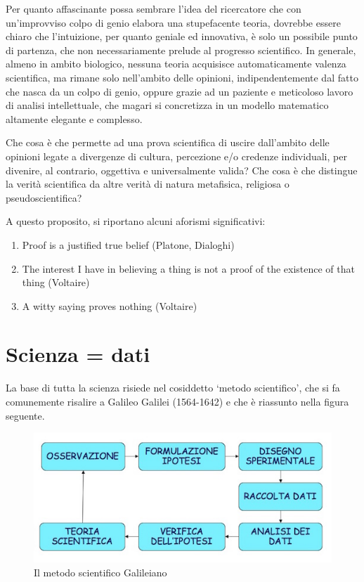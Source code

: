 \documentclass[a4paper,12pt,oneside]{book}
\providecommand{\tightlist}{%
  \setlength{\itemsep}{0pt}\setlength{\parskip}{0pt}}
\begin{document}
Per quanto affascinante possa sembrare l'idea del ricercatore che con un'improvviso colpo di genio elabora una stupefacente teoria, dovrebbe essere chiaro che l'intuizione, per quanto geniale ed innovativa, è solo un possibile punto di partenza, che non necessariamente prelude al progresso scientifico. In generale, almeno in ambito biologico, nessuna teoria acquisisce automaticamente valenza scientifica, ma rimane solo nell'ambito delle opinioni, indipendentemente dal fatto che nasca da un colpo di genio, oppure grazie ad un paziente e meticoloso lavoro di analisi intellettuale, che magari si concretizza in un modello matematico altamente elegante e complesso.

Che cosa è che permette ad una prova scientifica di uscire dall'ambito delle opinioni legate a divergenze di cultura, percezione e/o credenze individuali, per divenire, al contrario, oggettiva e universalmente valida? Che cosa è che distingue la verità scientifica da altre verità di natura metafisica, religiosa o pseudoscientifica?

A questo proposito, si riportano alcuni aforismi significativi:

\begin{enumerate}
\def\labelenumi{\arabic{enumi}.}
\tightlist
\item
  Proof is a justified true belief (Platone, Dialoghi)
\item
  The interest I have in believing a thing is not a proof of the existence of that thing (Voltaire)
\item
  A witty saying proves nothing (Voltaire)
\end{enumerate}

\hypertarget{scienza-dati}{%
\section{Scienza = dati}\label{scienza-dati}}

La base di tutta la scienza risiede nel cosiddetto `metodo scientifico', che si fa comunemente risalire a Galileo Galilei (1564-1642) e che è riassunto nella figura seguente.

\begin{figure}

{\centering \includegraphics[width=0.75\linewidth]{_images/MSAMap} 

}

\caption{Il metodo scientifico Galileiano}\label{fig:figName11}
\end{figure}
\end{document}
